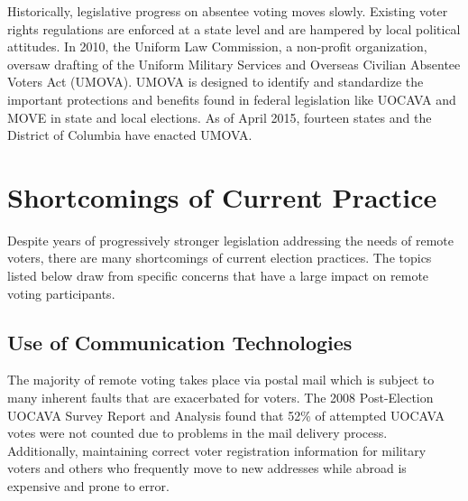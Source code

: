 
Historically, legislative progress on absentee voting moves
slowly. Existing voter rights regulations are enforced at a state
level and are hampered by local political attitudes. In 2010, the
Uniform Law Commission, a non-profit organization, oversaw drafting of
the Uniform Military Services and Overseas Civilian Absentee Voters
Act (UMOVA). UMOVA is designed to identify and standardize the
important protections and benefits found in federal legislation like
UOCAVA and MOVE in state and local elections. As of April 2015,
fourteen states and the District of Columbia have enacted UMOVA.

\section{Shortcomings of Current Practice}

Despite years of progressively stronger legislation addressing the
needs of remote voters, there are many shortcomings of current
election practices. The topics listed below draw from specific
concerns that have a large impact on remote voting participants.

\subsection{Use of Communication Technologies}
The majority of remote voting takes place via postal mail which is
subject to many inherent faults that are exacerbated for voters. The
2008 Post-Election UOCAVA Survey Report and Analysis found that 52\%
of attempted UOCAVA votes were not counted due to problems in the mail
delivery process. Additionally, maintaining correct voter registration
information for military voters and others who frequently move to new
addresses while abroad is expensive and prone to error.



